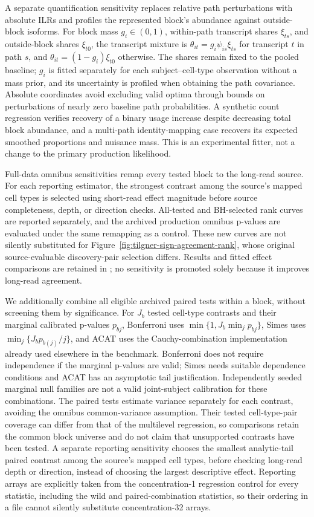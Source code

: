 \documentclass[11pt]{article}
\begin{document}
A separate quantification sensitivity replaces relative path perturbations with absolute ILRs and profiles the represented block's abundance against outside-block isoforms. For block mass \(g_i\in(0,1)\), within-path transcript shares \(\xi_{ts}\), and outside-block shares \(\xi_{t0}\), the transcript mixture is \(\theta_{it}=g_i\psi_{is}\xi_{ts}\) for transcript \(t\) in path \(s\), and \(\theta_{it}=(1-g_i)\xi_{t0}\) otherwise. The shares remain fixed to the pooled baseline; \(g_i\) is fitted separately for each subject--cell-type observation without a mass prior, and its uncertainty is profiled when obtaining the path covariance. Absolute coordinates avoid excluding valid optima through bounds on perturbations of nearly zero baseline path probabilities. A synthetic count regression verifies recovery of a binary usage increase despite decreasing total block abundance, and a multi-path identity-mapping case recovers its expected smoothed proportions and nuisance mass. This is an experimental fitter, not a change to the primary production likelihood.

Full-data omnibus sensitivities remap every tested block to the long-read source. For each reporting estimator, the strongest contrast among the source's mapped cell types is selected using short-read effect magnitude before source completeness, depth, or direction checks. All-tested and BH-selected rank curves are reported separately, and the archived production omnibus p-values are evaluated under the same remapping as a control. These new curves are not silently substituted for Figure~\ref{fig:tilgner-sign-agreement-rank}, whose original source-evaluable discovery-pair selection differs. Results and fitted effect comparisons are retained in ; no sensitivity is promoted solely because it improves long-read agreement.

We additionally combine all eligible archived paired tests within a block, without screening them by significance. For \(J_b\) tested cell-type contrasts and their marginal calibrated p-values \(p_{bj}\), Bonferroni uses \(\min\{1,J_b\min_jp_{bj}\}\), Simes uses \(\min_j\{J_bp_{b(j)}/j\}\), and ACAT uses the Cauchy-combination implementation already used elsewhere in the benchmark. Bonferroni does not require independence if the marginal p-values are valid; Simes needs suitable dependence conditions and ACAT has an asymptotic tail justification. Independently seeded marginal null families are not a valid joint-subject calibration for these combinations. The paired tests estimate variance separately for each contrast, avoiding the omnibus common-variance assumption. Their tested cell-type-pair coverage can differ from that of the multilevel regression, so comparisons retain the common block universe and do not claim that unsupported contrasts have been tested. A separate reporting sensitivity chooses the smallest analytic-tail paired contrast among the source's mapped cell types, before checking long-read depth or direction, instead of choosing the largest descriptive effect. Reporting arrays are explicitly taken from the concentration-1 regression control for every statistic, including the wild and paired-combination statistics, so their ordering in a file cannot silently substitute concentration-32 arrays.
\end{document}

